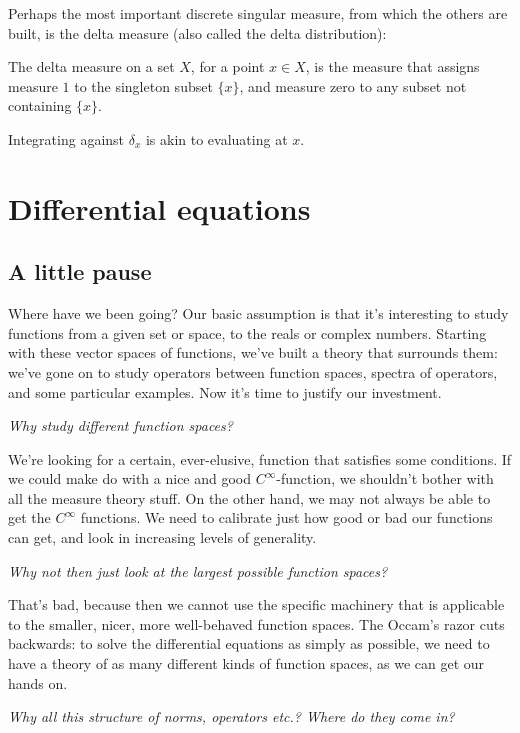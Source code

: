 \documentclass[a4paper]{amsart}
\begin{document}
Perhaps the most important discrete singular measure, from which the
others are built, is the delta measure (also called the delta distribution):

\begin{definer}
  The delta measure on a set $X$, for a point $x \in X$, is the
  measure that assigns measure $1$ to the singleton subset $\{ x \}$,
  and measure zero to any subset not containing $\{ x \}$.
\end{definer}

Integrating against $\delta_x$ is akin to evaluating at $x$.

\section{Differential equations}

\subsection{A little pause}

Where have we been going? Our basic assumption is that it's
interesting to study functions from a given set or space, to the reals
or complex numbers. Starting with these vector spaces of functions,
we've built a theory that surrounds them: we've gone on to study
operators between function spaces, spectra of operators, and some
particular examples. Now it's time to justify our investment.

{\em Why study different function spaces?}

We're looking for a certain, ever-elusive, function that satisfies
some conditions. If we could make do with a nice and good
$C^\infty$-function, we shouldn't bother with all the measure theory
stuff. On the other hand, we may not always be able to get the
$C^\infty$ functions. We need to calibrate just how good or bad our
functions can get, and look in increasing levels of generality.

{\em Why not then just look at the largest possible function spaces?}

That's bad, because then we cannot use the specific machinery that is
applicable to the smaller, nicer, more well-behaved function
spaces. The Occam's razor cuts backwards: to solve the differential
equations as simply as possible, we need to have a theory of as many
different kinds of function spaces, as we can get our hands on.

{\em Why all this structure of norms, operators etc.? Where do they come in?}
\end{document}
